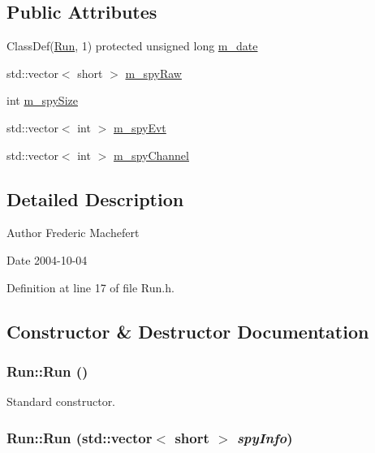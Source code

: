\subsection*{Public Attributes}
\begin{DoxyCompactItemize}
\item 
ClassDef(\hyperlink{classRun}{Run}, 1) protected unsigned long \hyperlink{classRun_a841000f96566fdbe5772f16ef3963006}{m\_\-date}
\item 
std::vector$<$ short $>$ \hyperlink{classRun_a825ab81f2a93f291878235dc13536688}{m\_\-spyRaw}
\item 
int \hyperlink{classRun_a343bd5a0475c262da9b366933cf3a523}{m\_\-spySize}
\item 
std::vector$<$ int $>$ \hyperlink{classRun_ae812e1695eafeb95fb54594047e98d95}{m\_\-spyEvt}
\item 
std::vector$<$ int $>$ \hyperlink{classRun_abe97602a3597cc941906069386a8d9aa}{m\_\-spyChannel}
\end{DoxyCompactItemize}


\subsection{Detailed Description}
\begin{DoxyAuthor}{Author}
Frederic Machefert 
\end{DoxyAuthor}
\begin{DoxyDate}{Date}
2004-\/10-\/04 
\end{DoxyDate}


Definition at line 17 of file Run.h.

\subsection{Constructor \& Destructor Documentation}
\hypertarget{classRun_ad9511732117430d7fcdc0c11796f0ef6}{
\subsubsection[{Run}]{\setlength{\rightskip}{0pt plus 5cm}Run::Run ()}}
\label{classRun_ad9511732117430d7fcdc0c11796f0ef6}


Standard constructor. \hypertarget{classRun_a45e6035b7001cde5d949b407faf0d8ca}{
\subsubsection[{Run}]{\setlength{\rightskip}{0pt plus 5cm}Run::Run (std::vector$<$ short $>$ {\em spyInfo})}}
\label{classRun_a45e6035b7001cde5d949b407faf0d8ca}



